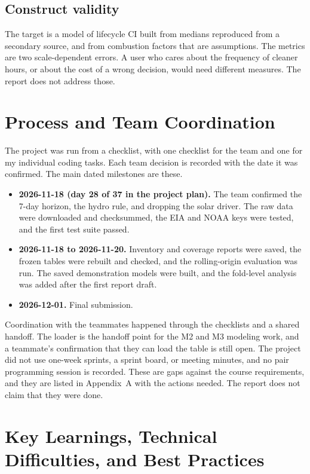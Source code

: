 \documentclass[10pt,journal,compsoc]{IEEEtran}
\begin{document}
\subsection{Construct validity}
The target is a model of lifecycle CI built from medians reproduced from a secondary source, and from combustion factors that are assumptions. The metrics are two scale-dependent errors. A user who cares about the frequency of cleaner hours, or about the cost of a wrong decision, would need different measures. The report does not address those.

\section{Process and Team Coordination}
\label{sec:process}
The project was run from a checklist, with one checklist for the team and one for my individual coding tasks. Each team decision is recorded with the date it was confirmed. The main dated milestones are these.
\begin{itemize}
\item \textbf{2026-11-18 (day 28 of 37 in the project plan).} The team confirmed the 7-day horizon, the hydro rule, and dropping the solar driver. The raw data were downloaded and checksummed, the EIA and NOAA keys were tested, and the first test suite passed.
\item \textbf{2026-11-18 to 2026-11-20.} Inventory and coverage reports were saved, the frozen tables were rebuilt and checked, and the rolling-origin evaluation was run. The saved demonstration models were built, and the fold-level analysis was added after the first report draft.
\item \textbf{2026-12-01.} Final submission.
\end{itemize}
Coordination with the teammates happened through the checklists and a shared handoff. The loader is the handoff point for the M2 and M3 modeling work, and a teammate's confirmation that they can load the table is still open. The project did not use one-week sprints, a sprint board, or meeting minutes, and no pair programming session is recorded. These are gaps against the course requirements, and they are listed in Appendix~A with the actions needed. The report does not claim that they were done.

\section{Key Learnings, Technical Difficulties, and Best Practices}
\label{sec:learn}
\end{document}
